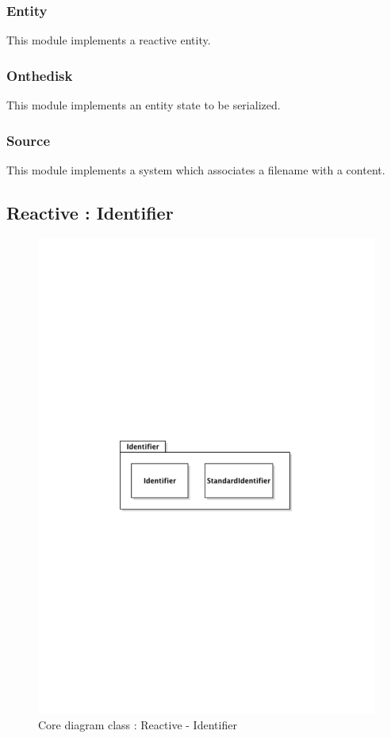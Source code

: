 		\subsubsection{Entity}
			This module implements a reactive entity.
		\subsubsection{Onthedisk}
			This module implements an entity state to be serialized.
		\subsubsection{Source}
			This module implements a system which associates a filename with a content.
	\subsection{Reactive : Identifier}
		\begin{figure}[ht]
			\begin{center}
				\includegraphics[width=\textwidth,  trim=2cm 12cm 2cm 12cm]{UML_figure/DC/core/reactive/DC_Identifier.pdf}
				\caption{Core diagram class : Reactive - Identifier}
			\end{center}
		\end{figure}
